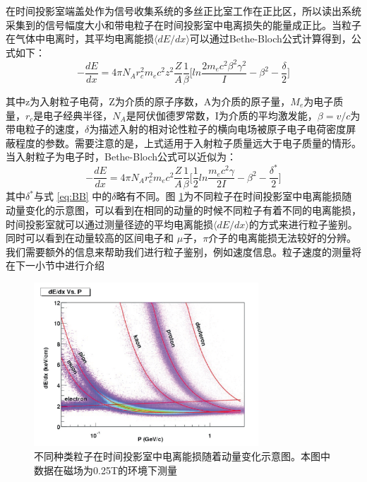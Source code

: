 在时间投影室端盖处作为信号收集系统的多丝正比室工作在正比区，所以读出系统采集到的信号幅度大小和带电粒子在时间投影室中电离损失的能量成正比。当粒子在气体中电离时，其平均电离能损$ \langle dE/dx \rangle $可以通过Bethe-Bloch公式计算得到，公式如下：
\begin{equation}
    -\frac{dE}{dx} = 4\pi N_A r_c^2 m_e c^2 z^2\frac{Z}{A}\frac{1}{\beta} \bigg[ ln\frac{2 m_e c^2 \beta^2 \gamma^2 }{I} - \beta^2 - \frac{\delta}{2} \bigg ]
    \label{eq:BB}
\end{equation}

其中z为入射粒子电荷，Z为介质的原子序数，A为介质的原子量，$M_e$为电子质量，$r_c$是电子经典半径，$N_A$是阿伏伽德罗常数，I为介质的平均激发能，$\beta = v/c$为带电粒子的速度，$\delta$为描述入射的相对论性粒子的横向电场被原子电子电荷密度屏蔽程度的参数。需要注意的是，上式适用于入射粒子质量远大于电子质量的情形。当入射粒子为电子时，Bethe-Bloch公式可以近似为：
\begin{equation}
    -\frac{dE}{dx} = 4\pi N_A r_c^2 m_e c^2 \frac{Z}{A}\frac{1}{\beta} \bigg[ \frac{1}{2}ln\frac{m_e c^2 \gamma }{2I} - \beta^2 - \frac{\delta^*}{2} \bigg ]
\end{equation}
其中$\delta^*$与式 \ref{eq:BB} 中的$\delta$略有不同。图 \ref{fig:dEdx}为不同粒子在时间投影室中电离能损随动量变化的示意图，可以看到在相同的动量的时候不同粒子有着不同的电离能损，时间投影室就可以通过测量径迹的平均电离能损$ \langle dE/dx \rangle $的方式来进行粒子鉴别。同时可以看到在动量较高的区间电子和 $\mu$子，$\pi$介子的电离能损无法较好的分辨。我们需要额外的信息来帮助我们进行粒子鉴别，例如速度信息。粒子速度的测量将在下一小节中进行介绍

\begin{figure}[htb]
    \begin{center}
    \includegraphics[width=0.75\textwidth,clip]{figures/Chapter2/dEdx.png}
    \end{center}
    \caption[粒子在时间投影室中的电离能损]{不同种类粒子在时间投影室中电离能损随着动量变化示意图。本图中数据在磁场为0.25T的环境下测量}
    \label{fig:dEdx}
\end{figure}




